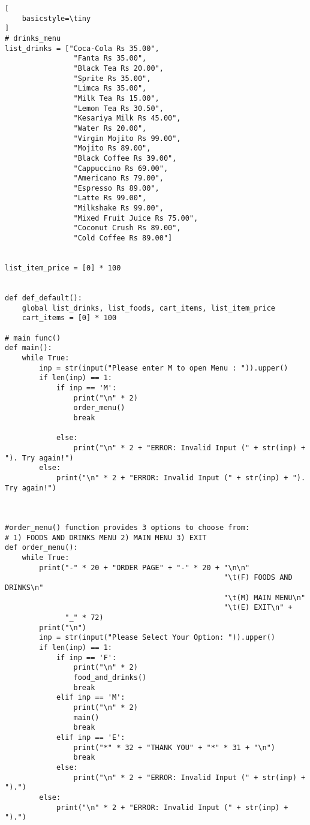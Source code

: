 \documentclass[11pt, a4paper]{article}
\begin{document}
\begin{lstlisting}[
    basicstyle=\tiny
]
# drinks_menu
list_drinks = ["Coca-Cola Rs 35.00",
                "Fanta Rs 35.00",
                "Black Tea Rs 20.00",
                "Sprite Rs 35.00",
                "Limca Rs 35.00",
                "Milk Tea Rs 15.00",
                "Lemon Tea Rs 30.50",
                "Kesariya Milk Rs 45.00",
                "Water Rs 20.00",
                "Virgin Mojito Rs 99.00",
                "Mojito Rs 89.00",
                "Black Coffee Rs 39.00",
                "Cappuccino Rs 69.00",
                "Americano Rs 79.00",
                "Espresso Rs 89.00",
                "Latte Rs 99.00",
                "Milkshake Rs 99.00",
                "Mixed Fruit Juice Rs 75.00",
                "Coconut Crush Rs 89.00",
                "Cold Coffee Rs 89.00"]


list_item_price = [0] * 100


def def_default():
    global list_drinks, list_foods, cart_items, list_item_price
    cart_items = [0] * 100

# main func()
def main():
    while True:
        inp = str(input("Please enter M to open Menu : ")).upper()
        if len(inp) == 1:
            if inp == 'M':
                print("\n" * 2)
                order_menu()
                break

            else:
                print("\n" * 2 + "ERROR: Invalid Input (" + str(inp) + "). Try again!")
        else:
            print("\n" * 2 + "ERROR: Invalid Input (" + str(inp) + "). Try again!")



#order_menu() function provides 3 options to choose from:
# 1) FOODS AND DRINKS MENU 2) MAIN MENU 3) EXIT
def order_menu():
    while True:
        print("-" * 20 + "ORDER PAGE" + "-" * 20 + "\n\n"
                                                   "\t(F) FOODS AND DRINKS\n"
                                                   "\t(M) MAIN MENU\n"
                                                   "\t(E) EXIT\n" +
              "_" * 72)
        print("\n")
        inp = str(input("Please Select Your Option: ")).upper()
        if len(inp) == 1:
            if inp == 'F':
                print("\n" * 2)
                food_and_drinks()
                break
            elif inp == 'M':
                print("\n" * 2)
                main()
                break
            elif inp == 'E':
                print("*" * 32 + "THANK YOU" + "*" * 31 + "\n")
                break
            else:
                print("\n" * 2 + "ERROR: Invalid Input (" + str(inp) + ").")
        else:
            print("\n" * 2 + "ERROR: Invalid Input (" + str(inp) + ").")


\end{lstlisting}
\end{document}
